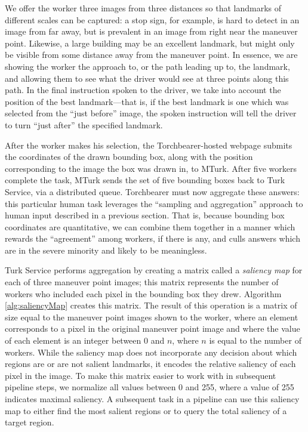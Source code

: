 We offer the worker three images from three distances so that landmarks of different scales can be captured: a stop sign, for example, is hard to detect in an image from far away, but is prevalent in an image from right near the maneuver point. Likewise, a large building may be an excellent landmark, but might only be visible from some distance away from the maneuver point. In essence, we are showing the worker the approach to, or the path leading up to, the landmark, and allowing them to see what the driver would see at three points along this path. In the final instruction spoken to the driver, we take into account the position of the best landmark---that is, if the best landmark is one which was selected from the “just before” image, the spoken instruction will tell the driver to turn “just after” the specified landmark.

After the worker makes his selection, the Torchbearer-hosted webpage submits the coordinates of the drawn bounding box, along with the position corresponding to the image the box was drawn in, to MTurk. After five workers complete the task, MTurk sends the set of five bounding boxes back to Turk Service, via a distributed queue. Torchbearer must now aggregate these answers: this particular human task leverages the “sampling and aggregation” approach to human input described in a previous section. That is, because bounding box coordinates are quantitative, we can combine them together in a manner which rewards the “agreement” among workers, if there is any, and culls answers which are in the severe minority and likely to be meaningless. 

Turk Service performs aggregation by creating a matrix called a \textit{saliency map} for each of three maneuver point images; this matrix represents the number of workers who included each pixel in the bounding box they drew. Algorithm \ref{alg:saliencyMap} creates this matrix. The result of this operation is a matrix of size equal to the maneuver point images shown to the worker, where an element corresponds to a pixel in the original maneuver point image and where the value of each element is an integer between 0 and $n$, where $n$ is equal to the number of workers. While the saliency map does not incorporate any decision about which regions are or are not salient landmarks, it encodes the relative saliency of each pixel in the image. To make this matrix easier to work with in subsequent pipeline steps, we normalize all values between 0 and 255, where a value of 255 indicates maximal saliency. A subsequent task in a pipeline can use this saliency map to either find the most salient regions or to query the total saliency of a target region.

